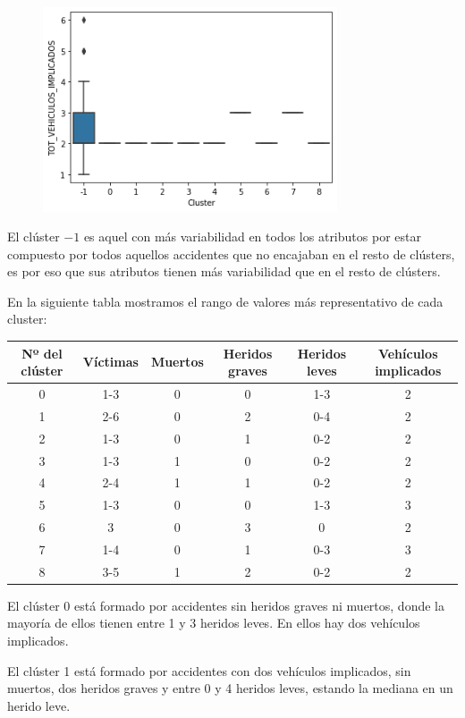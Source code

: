 \documentclass[a4]{article}
\begin{document}
\begin{figure}[H]
  \includegraphics[width=87mm]{imagenes/c1_dbscan_vi}
\end{figure}

El clúster $-1$ es aquel con más variabilidad en todos los atributos por estar compuesto por todos aquellos accidentes que no encajaban en el resto de clústers, es por eso que sus atributos tienen más variabilidad que en el resto de clústers.

\newpage
En la siguiente tabla mostramos el rango de valores más representativo de cada cluster:

\begin{center}
\begin{tabular}{|c|c|c|c|c|c|}
\hline
\multicolumn{1}{|c|}{\textbf{Nº del clúster}} & \textbf{Víctimas} & \textbf{Muertos} & \textbf{Heridos graves} & \textbf{Heridos leves} & \textbf{Vehículos implicados}\\ \hline
  0  & 1-3 & 0 & 0 & 1-3 & 2 \\ \hline
  1  & 2-6 & 0 & 2 & 0-4 & 2 \\ \hline
  2  & 1-3 & 0 & 1 & 0-2 & 2 \\ \hline
  3  & 1-3 & 1 & 0 & 0-2 & 2 \\ \hline
  4  & 2-4 & 1 & 1 & 0-2 & 2 \\ \hline
  5  & 1-3 & 0 & 0 & 1-3 & 3 \\ \hline
  6  & 3   & 0 & 3 & 0   & 2 \\ \hline
  7  & 1-4 & 0 & 1 & 0-3 & 3 \\ \hline
  8  & 3-5 & 1 & 2 & 0-2 & 2 \\ \hline
\end{tabular}
\end{center}

El clúster 0 está formado por accidentes sin heridos graves ni muertos, donde la mayoría de ellos tienen entre 1 y 3 heridos leves. En ellos hay dos vehículos implicados.

El clúster 1 está formado por accidentes con dos vehículos implicados, sin muertos, dos heridos graves y entre 0 y 4 heridos leves, estando la mediana en un herido leve.
\end{document}
